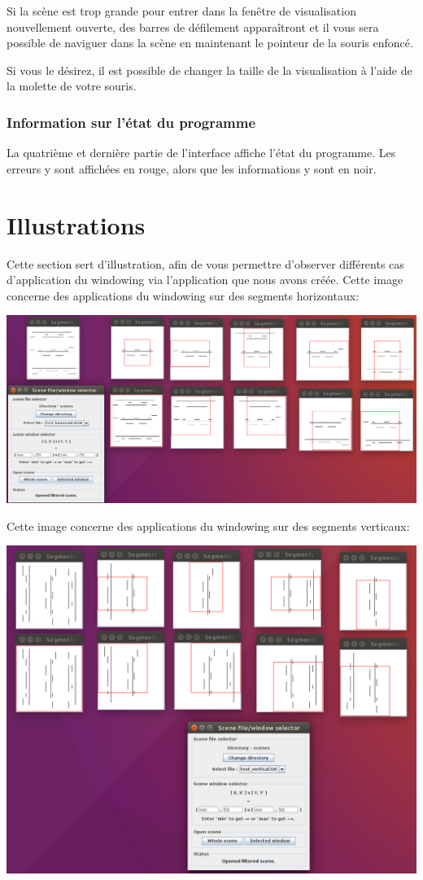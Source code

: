 \documentclass[10pt,a4paper]{article}
\begin{document}
Si la scène est trop grande pour entrer dans la fenêtre de visualisation nouvellement ouverte, des barres de défilement apparaîtront et il vous sera possible de naviguer dans la scène en maintenant le pointeur de la souris enfoncé.

Si vous le désirez, il est possible de changer la taille de la visualisation à l'aide de la molette de votre souris.

\subsubsection{Information sur l'état du programme}
La quatrième et dernière partie de l'interface affiche l'état du programme. Les erreurs y sont affichées en rouge, alors que les informations y sont en noir.

\section{Illustrations}
Cette section sert d'illustration, afin de vous permettre d'observer différents cas d'application du windowing via l'application que nous avons créée.
Cette image concerne des applications du windowing sur des segments horizontaux:

\includegraphics[scale=0.25]{images/test_horizontal.png}

Cette image concerne des applications du windowing sur des segments verticaux:

\includegraphics[scale=0.25]{images/test_vertical.png}
\end{document}
